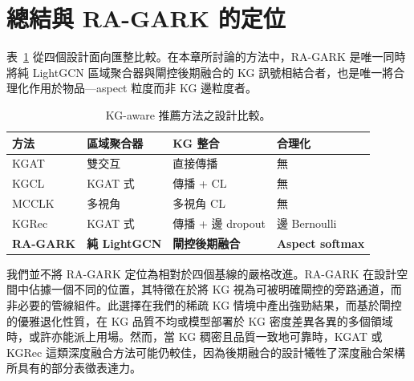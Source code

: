 \section{總結與 RA-GARK 的定位}
\label{sec:rw-summary-zh}

表~\ref{tab:rw-summary-zh} 從四個設計面向匯整比較。在本章所討論的方法中，RA-GARK 是唯一同時將純 LightGCN 區域聚合器與閘控後期融合的 KG 訊號相結合者，也是唯一將合理化作用於物品—aspect 粒度而非 KG 邊粒度者。

\begin{table}[!htbp]
\centering
\caption{KG-aware 推薦方法之設計比較。}
\label{tab:rw-summary-zh}
\begin{tabular}{l l l l}
\toprule
方法 & 區域聚合器 & KG 整合 & 合理化 \\
\midrule
KGAT       & 雙交互           & 直接傳播             & 無 \\
KGCL       & KGAT 式          & 傳播 + CL            & 無 \\
MCCLK      & 多視角           & 多視角 CL            & 無 \\
KGRec      & KGAT 式          & 傳播 + 邊 dropout    & 邊 Bernoulli \\
\midrule
\textbf{RA-GARK} & \textbf{純 LightGCN} & \textbf{閘控後期融合} & \textbf{Aspect softmax} \\
\bottomrule
\end{tabular}
\end{table}
\FloatBarrier

我們並不將 RA-GARK 定位為相對於四個基線的嚴格改進。RA-GARK 在設計空間中佔據一個不同的位置，其特徵在於將 KG 視為可被明確閘控的旁路通道，而非必要的管線組件。此選擇在我們的稀疏 KG 情境中產出強勁結果，而基於閘控的優雅退化性質，在 KG 品質不均或模型部署於 KG 密度差異各異的多個領域時，或許亦能派上用場。然而，當 KG 稠密且品質一致地可靠時，KGAT 或 KGRec 這類深度融合方法可能仍較佳，因為後期融合的設計犧牲了深度融合架構所具有的部分表徵表達力。
